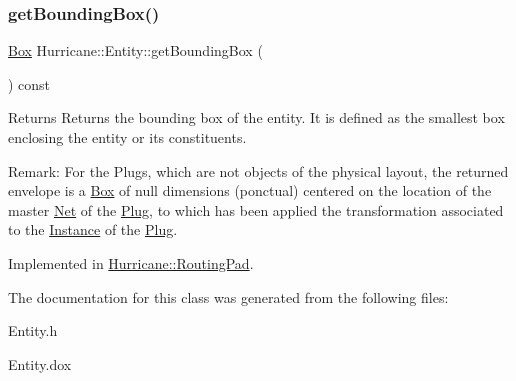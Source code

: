 \subsubsection{\texorpdfstring{get\+Bounding\+Box()}{getBoundingBox()}}
{\footnotesize\ttfamily \mbox{\hyperlink{classHurricane_1_1Box}{Box}} Hurricane\+::\+Entity\+::get\+Bounding\+Box (\begin{DoxyParamCaption}{ }\end{DoxyParamCaption}) const\hspace{0.3cm}{\ttfamily [pure virtual]}}

\begin{DoxyReturn}{Returns}
Returns the bounding box of the entity. It is defined as the smallest box enclosing the entity or its constituents.
\end{DoxyReturn}
\begin{DoxyParagraph}{Remark\+: For the Plugs, which are not objects of the physical layout,}
the returned envelope is a \mbox{\hyperlink{classHurricane_1_1Box}{Box}} of null dimensions (ponctual) centered on the location of the master \mbox{\hyperlink{classHurricane_1_1Net}{Net}} of the \mbox{\hyperlink{classHurricane_1_1Plug}{Plug}}, to which has been applied the transformation associated to the \mbox{\hyperlink{classHurricane_1_1Instance}{Instance}} of the \mbox{\hyperlink{classHurricane_1_1Plug}{Plug}}. 
\end{DoxyParagraph}


Implemented in \mbox{\hyperlink{classHurricane_1_1RoutingPad_a2cc2894b5e1c82b725dedcf1978dc773}{Hurricane\+::\+Routing\+Pad}}.



The documentation for this class was generated from the following files\+:\begin{DoxyCompactItemize}
\item 
Entity.\+h\item 
Entity.\+dox\end{DoxyCompactItemize}
